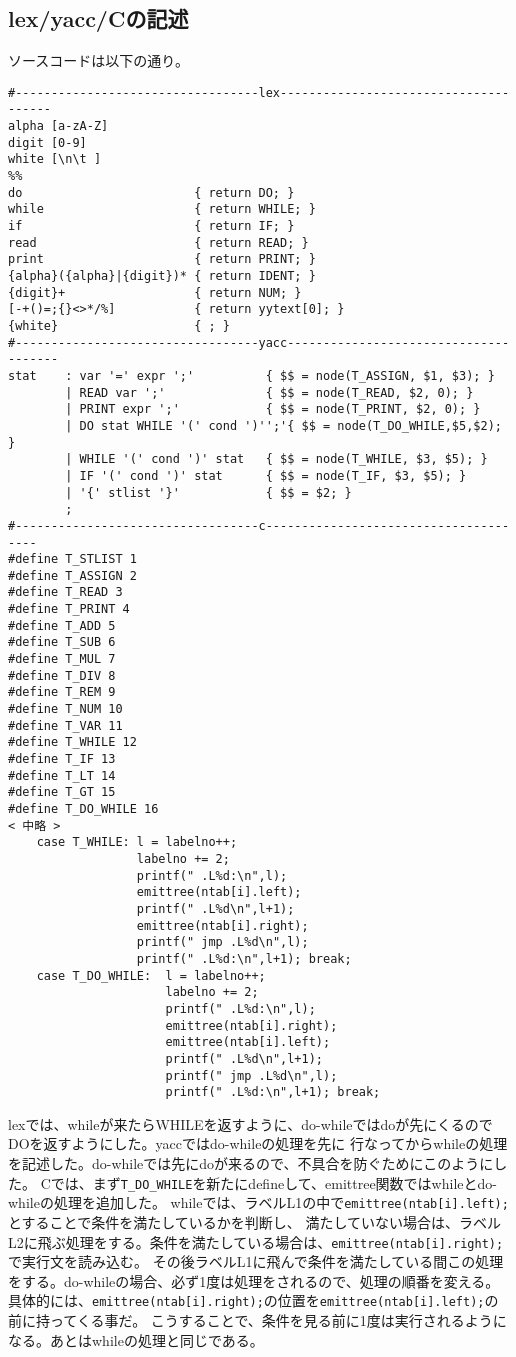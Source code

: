 \documentclass[a4paper,11pt]{jarticle}
\begin{document}
\subsection{lex/yacc/Cの記述}
ソースコードは以下の通り。\\
\begin{verbatim}
#----------------------------------lex--------------------------------------
alpha [a-zA-Z]
digit [0-9]
white [\n\t ]
%%
do                        { return DO; }
while                     { return WHILE; }
if                        { return IF; }
read                      { return READ; }
print                     { return PRINT; }
{alpha}({alpha}|{digit})* { return IDENT; }
{digit}+                  { return NUM; }
[-+()=;{}<>*/%]           { return yytext[0]; }
{white}                   { ; }
#----------------------------------yacc--------------------------------------
stat    : var '=' expr ';'          { $$ = node(T_ASSIGN, $1, $3); }
        | READ var ';'              { $$ = node(T_READ, $2, 0); }
        | PRINT expr ';'            { $$ = node(T_PRINT, $2, 0); }
        | DO stat WHILE '(' cond ')'';'{ $$ = node(T_DO_WHILE,$5,$2); }
        | WHILE '(' cond ')' stat   { $$ = node(T_WHILE, $3, $5); }
        | IF '(' cond ')' stat      { $$ = node(T_IF, $3, $5); }
        | '{' stlist '}'            { $$ = $2; }
        ;
#----------------------------------c--------------------------------------
#define T_STLIST 1
#define T_ASSIGN 2
#define T_READ 3
#define T_PRINT 4
#define T_ADD 5
#define T_SUB 6
#define T_MUL 7
#define T_DIV 8
#define T_REM 9
#define T_NUM 10
#define T_VAR 11
#define T_WHILE 12
#define T_IF 13
#define T_LT 14
#define T_GT 15
#define T_DO_WHILE 16
< 中略 >
    case T_WHILE: l = labelno++;
                  labelno += 2;
                  printf(" .L%d:\n",l);
                  emittree(ntab[i].left);
                  printf(" .L%d\n",l+1);
                  emittree(ntab[i].right);
                  printf(" jmp .L%d\n",l);
                  printf(" .L%d:\n",l+1); break;
    case T_DO_WHILE:  l = labelno++;
                      labelno += 2;
                      printf(" .L%d:\n",l);
                      emittree(ntab[i].right);
                      emittree(ntab[i].left);
                      printf(" .L%d\n",l+1);
                      printf(" jmp .L%d\n",l);
                      printf(" .L%d:\n",l+1); break;
\end{verbatim}
lexでは、whileが来たらWHILEを返すように、do-whileではdoが先にくるのでDOを返すようにした。yaccではdo-whileの処理を先に
行なってからwhileの処理を記述した。do-whileでは先にdoが来るので、不具合を防ぐためにこのようにした。
Cでは、まず\verb|T_DO_WHILE|を新たにdefineして、emittree関数ではwhileとdo-whileの処理を追加した。
whileでは、ラベルL1の中で\verb|emittree(ntab[i].left);|とすることで条件を満たしているかを判断し、
満たしていない場合は、ラベルL2に飛ぶ処理をする。条件を満たしている場合は、\verb|emittree(ntab[i].right);|で実行文を読み込む。
その後ラベルL1に飛んで条件を満たしている間この処理をする。do-whileの場合、必ず1度は処理をされるので、処理の順番を変える。
具体的には、\verb|emittree(ntab[i].right);|の位置を\verb|emittree(ntab[i].left);|の前に持ってくる事だ。
こうすることで、条件を見る前に1度は実行されるようになる。あとはwhileの処理と同じである。\\
\end{document}
